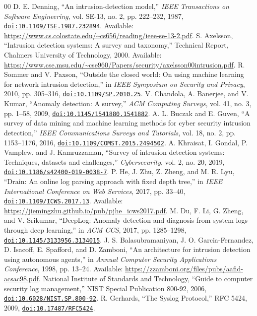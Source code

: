 \documentclass[journal]{IEEEtran}
\newcommand{\doiurl}[1]{\href{https://doi.org/#1}{\nolinkurl{doi:#1}}}
\begin{document}
\balance
\begin{thebibliography}{00}
 D. E. Denning, ``An intrusion-detection model,'' \emph{IEEE Transactions on Software Engineering}, vol. SE-13, no. 2, pp. 222--232, 1987, \doiurl{10.1109/TSE.1987.232894}. Available: \url{https://www.cs.colostate.edu/~cs656/reading/ieee-se-13-2.pdf}.
 S. Axelsson, ``Intrusion detection systems: A survey and taxonomy,'' Technical Report, Chalmers University of Technology, 2000. Available: \url{https://www.cse.msu.edu/~cse960/Papers/security/axelsson00intrusion.pdf}.
 R. Sommer and V. Paxson, ``Outside the closed world: On using machine learning for network intrusion detection,'' in \emph{IEEE Symposium on Security and Privacy}, 2010, pp. 305--316, \doiurl{10.1109/SP.2010.25}.
 V. Chandola, A. Banerjee, and V. Kumar, ``Anomaly detection: A survey,'' \emph{ACM Computing Surveys}, vol. 41, no. 3, pp. 1--58, 2009, \doiurl{10.1145/1541880.1541882}.
 A. L. Buczak and E. Guven, ``A survey of data mining and machine learning methods for cyber security intrusion detection,'' \emph{IEEE Communications Surveys and Tutorials}, vol. 18, no. 2, pp. 1153--1176, 2016, \doiurl{10.1109/COMST.2015.2494502}.
 A. Khraisat, I. Gondal, P. Vamplew, and J. Kamruzzaman, ``Survey of intrusion detection systems: Techniques, datasets and challenges,'' \emph{Cybersecurity}, vol. 2, no. 20, 2019, \doiurl{10.1186/s42400-019-0038-7}.
 P. He, J. Zhu, Z. Zheng, and M. R. Lyu, ``Drain: An online log parsing approach with fixed depth tree,'' in \emph{IEEE International Conference on Web Services}, 2017, pp. 33--40, \doiurl{10.1109/ICWS.2017.13}. Available: \url{https://jiemingzhu.github.io/pub/pjhe_icws2017.pdf}.
 M. Du, F. Li, G. Zheng, and V. Srikumar, ``DeepLog: Anomaly detection and diagnosis from system logs through deep learning,'' in \emph{ACM CCS}, 2017, pp. 1285--1298, \doiurl{10.1145/3133956.3134015}.
 J. S. Balasubramaniyan, J. O. Garcia-Fernandez, D. Isacoff, E. Spafford, and D. Zamboni, ``An architecture for intrusion detection using autonomous agents,'' in \emph{Annual Computer Security Applications Conference}, 1998, pp. 13--24. Available: \url{https://zzamboni.org/files/pubs/aafid-acsac98.pdf}.
 National Institute of Standards and Technology, ``Guide to computer security log management,'' NIST Special Publication 800-92, 2006, \doiurl{10.6028/NIST.SP.800-92}.
 R. Gerhards, ``The Syslog Protocol,'' RFC 5424, 2009, \doiurl{10.17487/RFC5424}.
\end{thebibliography}
\end{document}
